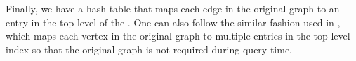 Finally, we have a hash table that maps each edge in the original graph to an entry in the top level of the \twolevelindex{}. One can also follow the similar fashion used in \cite{akbas2017truss}, which maps each vertex in the original graph to multiple entries in the top level index so that the original graph is not required during query time.
